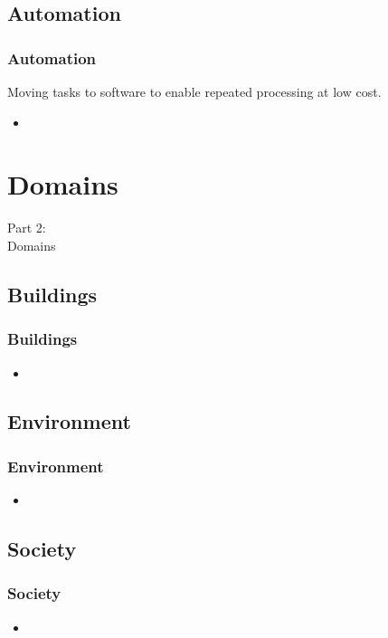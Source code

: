 \subsection{Automation}
\begin{frame}
    \frametitle{Automation}
    \vspace{0mm}
    Moving tasks to software to enable repeated processing at low cost.
    \vspace{3mm}
    \begin{itemize}
        \item
    \end{itemize}
\end{frame}

\section{Domains}
\begin{frame}
    \vspace{25mm}
    \begin{center}
        \Huge{Part 2:\\Domains}
    \end{center}
\end{frame}

\subsection{Buildings}
\begin{frame}
    \frametitle{Buildings}
    \vspace{3mm}
    \begin{itemize}
        \item
    \end{itemize}
\end{frame}

\subsection{Environment}
\begin{frame}
    \frametitle{Environment}
    \vspace{3mm}
    \begin{itemize}
        \item
    \end{itemize}
\end{frame}

\subsection{Society}
\begin{frame}
    \frametitle{Society}
    \vspace{3mm}
    \begin{itemize}
        \item
    \end{itemize}
\end{frame}

